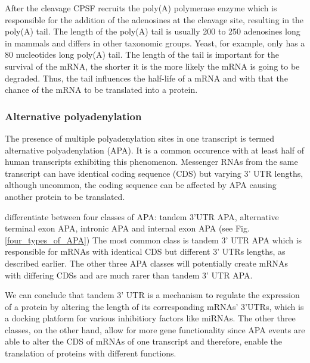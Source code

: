 After the cleavage CPSF recruits the poly(A) polymerase enzyme which is responsible for the addition of the adenosines at the cleavage site, resulting in the poly(A) tail. The length of the poly(A) tail is usually 200 to 250 adenosines long in mammals and differs in other taxonomic groups. Yeast, for example, only has a 80 nucleotides long poly(A) tail. The length of the tail is important for the survival of the mRNA, the shorter it is the more likely the mRNA is going to be degraded. Thus, the tail influences the half-life of a mRNA and with that the chance of the mRNA to be translated into a protein. 

\subsubsection{Alternative polyadenylation}
\label{apa}
The presence of multiple polyadenylation sites in one transcript is termed alternative polyadenylation (APA). It is a common occurence with at least half of human transcripts exhibiting this phenomenon. \citep{pmid23774734} Messenger RNAs from the same transcript can have identical coding sequence (CDS) but varying 3' UTR lengths, although uncommon, the coding sequence can be affected by APA causing another protein to be translated. 

\citeauthor{pmid23774734} differentiate between four classes of APA: tandem 3'UTR APA, alternative terminal exon APA, intronic APA and internal exon APA (see Fig. \ref{four_types_of_APA}) The most common class is tandem 3' UTR APA which is responsible for mRNAs with identical CDS but different 3' UTRs lengths, as described earlier. The other three APA classes will potentially create mRNAs with differing CDSs and are much rarer than tandem 3' UTR APA. 

We can conclude that tandem 3' UTR is a mechanism to regulate the expression of a protein by altering the length of its corresponding mRNAs' 3'UTRs, which is a docking platform for various inhibitiory factors like miRNAs. The other three classes, on the other hand, allow for more gene functionality since APA events are able to alter the CDS of mRNAs of one transcript and therefore, enable the translation of proteins with different functions.

